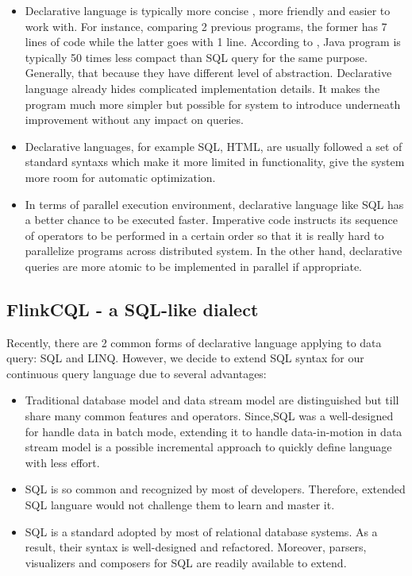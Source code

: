 \begin{itemize}
	\item Declarative language is typically more concise , more friendly and easier to work with. For instance, comparing 2 previous programs, the former has 7 lines of code while the latter goes with 1 line. According to \citep{Ronnie:2015}, Java program is typically 50 times less compact than SQL query for the same purpose. Generally, that because they have different level of abstraction. Declarative language already hides complicated implementation details. It makes the program much more simpler but possible for system to introduce underneath improvement without any impact on queries.
	\item Declarative languages, for example SQL, HTML,  are usually followed a set of standard syntaxs which make it more limited in functionality, give the system more room for automatic optimization. 
	\item In terms of parallel execution environment, declarative language like SQL has a better chance to be executed faster. Imperative code instructs its sequence of operators to be performed in a certain order so that it is really hard to parallelize programs across distributed system. In the other hand, declarative queries are more atomic to be implemented in parallel if appropriate.
\end{itemize}

\subsection*{FlinkCQL - a SQL-like dialect}
Recently, there are 2 common forms of declarative language applying to data query: SQL and LINQ. However, we decide to extend SQL syntax for our continuous query language due to several advantages:
\begin{itemize}
	\item Traditional database model and data stream model are distinguished but till share many common features and operators. Since,SQL was a well-designed for handle data in batch mode, extending it to handle data-in-motion in data stream model is a possible incremental approach to quickly define language with less effort.
	\item SQL is so common and recognized by most of developers. Therefore, extended SQL languare would not challenge them to learn and master it.
	\item SQL is a standard adopted by most of relational database systems. As a result, their syntax is well-designed and refactored. Moreover, parsers, visualizers and composers for SQL are readily available to extend.
\end{itemize}

